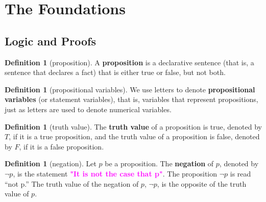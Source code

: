 \documentclass[letterpaper,10pt]{article}
\theoremstyle{plain}
\theoremstyle{definition}
\newtheorem{defn}[thm]{Definition}
\theoremstyle{remark}
\providecommand{\todo}[1]{\textcolor{magenta}{\textbf{#1}}}
\begin{document}
\pagestyle{fancy}

\section{The Foundations}
\subsection{Logic and Proofs}

\begin{defn}[proposition]
A \textbf{proposition} is a declarative sentence (that is, a sentence that declares a fact) that is either true
or false, but not both.
\end{defn}

\begin{defn}[propositional variables]
We use letters to denote \textbf{propositional variables} (or statement variables), that is, variables that represent propositions, just as letters are used to denote numerical variables.
\end{defn}
\begin{defn}[truth value] The \textbf{truth value} of a proposition is true, denoted by $T$, if it is a true proposition, and the truth value of a proposition
is false, denoted by $F$, if it is a false proposition.
\end{defn}

\begin{defn}[negation]
Let $p$ be a proposition. The \textbf{negation} of $p$, denoted by $ \lnot p$, is the statement 
\newline\todo{"It is not the case that p"}. 
\newline The proposition $\lnot p$ is read “not p.” The truth value of the negation of $p$, $\lnot p$, is the opposite of the truth value of $p$.
\end{defn}
\end{document}
